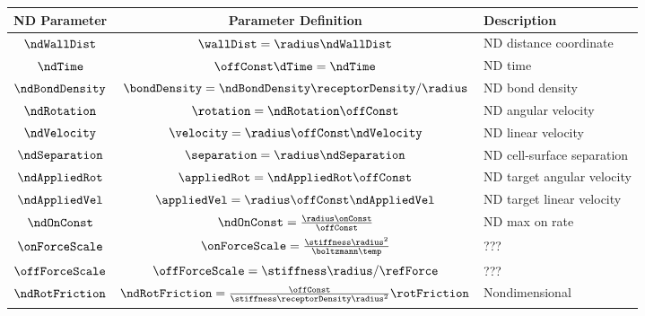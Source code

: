 \begin{table}
  \renewcommand{\arraystretch}{1.5}
  \centering
  \begin{tabular}{ccl}
    \toprule
    ND Parameter & Parameter Definition & Description \\
    \midrule
    $\ndWallDist$ & $\wallDist = \radius\ndWallDist$ & ND distance
                                                       coordinate \\
    $\ndTime$ & $\offConst \dTime = \ndTime$ & ND time \\ 
    $\ndBondDensity$ & $\bondDensity = \ndBondDensity
                       \receptorDensity/\radius$ & ND bond density \\
    $\ndRotation$ & $\rotation = \ndRotation \offConst$ & ND angular
                                                          velocity \\
    $\ndVelocity$ & $\velocity = \radius \offConst \ndVelocity$ & ND
                                                                  linear
                                                                  velocity
    \\ 
    $\ndSeparation$ & $\separation = \radius \ndSeparation$ & ND
                                                              cell-surface
                                                              separation
    \\ 
    $\ndAppliedRot$ & $\appliedRot = \ndAppliedRot \offConst$ & ND
                                                                target
                                                                angular
                                                                velocity \\
    $\ndAppliedVel$ & $\appliedVel = \radius \offConst \ndAppliedVel$
                                        & ND target linear velocity \\ 
    $\ndOnConst$ & $\ndOnConst = \frac{\radius \onConst}{\offConst}$
                                        & ND max on rate \\
    $\onForceScale$ & $\onForceScale = \frac{\stiffness
                      \radius^2}{\boltzmann \temp}$ & ??? \\
    $\offForceScale$ & $\offForceScale = \stiffness \radius/\refForce$
                                        & ??? \\
    $\ndRotFriction$ & $\ndRotFriction = \frac{\offConst}{\stiffness
                       \receptorDensity \radius^2} \rotFriction$ &
                                                                   Nondimensional

\end{tabular}
\end{table}
